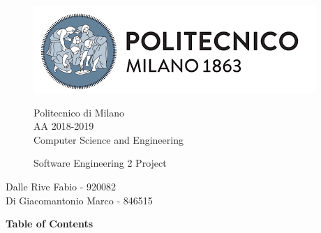 \documentclass{article}
\begin{document}
\begin{figure}[t!]
	\includegraphics[width= \linewidth]{PolimiLogo.png}
	\begin{center}
	Politecnico di Milano\\[4pt]
	AA 2018-2019  \\[4pt]
	Computer Science and Engineering \\[4pt]
	\begin{large}
	Software Engineering 2 Project
	\end{large}
	\end{center}
\end{figure}
\begin{flushright}
\begin{large}
Dalle Rive Fabio - 920082 \\[4pt]
Di Giacomantonio Marco - 846515 \\[4pt]
\end{large}
\end{flushright}
\newpage
\textbf{Table of Contents}
\end{document}
